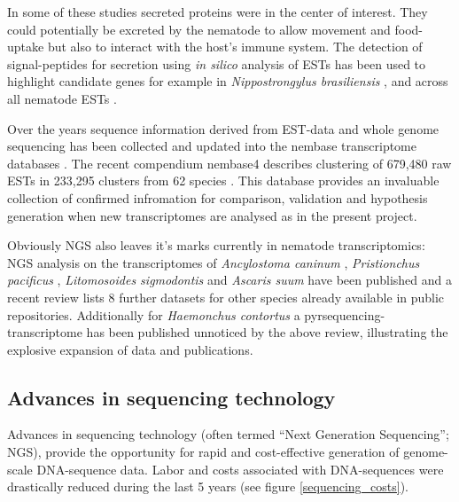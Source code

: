 In some of these studies secreted proteins were in the center of
interest. They could potentially be excreted by the nematode to allow
movement and food-uptake but also to interact with the host's immune
system. The detection of signal-peptides for secretion using
\textit{in silico} analysis of ESTs has been used to highlight
candidate genes for example in \textit{Nippostrongylus brasiliensis}
\cite{harcus_signal_2004}, and across all nematode ESTs
\cite{nagaraj_needles_2008}.

Over the years sequence information derived from EST-data and whole
genome sequencing has been collected and updated into the nembase
transcriptome databases
\cite{parkinson_nembase:resource_2004,wasmuth_extent_2008}. The recent
compendium nembase4 describes clustering of 679,480 raw ESTs in
233,295 clusters from 62 species \cite{pmid21550347}. This database
provides an invaluable collection of confirmed infromation for
comparison, validation and hypothesis generation when new
transcriptomes are analysed as in the present project.

Obviously NGS also leaves it's marks currently in nematode
transcriptomics: NGS analysis on the transcriptomes of
\textit{Ancylostoma caninum} \cite{pmid20470405}, \textit{Pristionchus
  pacificus} \cite{pmid20237107}, \textit{Litomosoides sigmodontis}
\cite{pmid20950480} and \textit{Ascaris suum} \cite{pmid21685128} have
been published and a recent review \cite{pmid22044053} lists 8 further
datasets for other species already available in public
repositories. Additionally for \textit{Haemonchus contortus} a
pyrsequencing-transcriptome has been published \cite{pmid20420710}
unnoticed by the above review, illustrating the explosive expansion of
data and publications.

\subsection{Advances in sequencing technology}
\label{sec:ad-seq}

Advances in sequencing technology (often termed ``Next Generation
Sequencing''; NGS), provide the opportunity for rapid and
cost-effective generation of genome-scale DNA-sequence data. Labor and
costs associated with DNA-sequences were drastically reduced during
the last 5 years (see figure \ref{sequencing_costs}).


